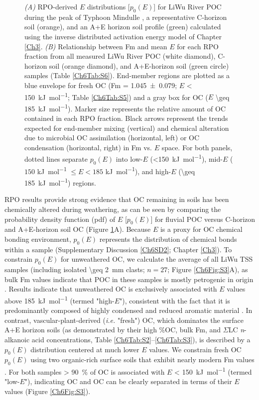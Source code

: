 \begin{figure}[p]
	\caption[RPO $p_{0}(E)$ distributions and $E$ vs. Fm plots]{\textit{(A)} RPO-derived $E$ distributions [$p_{0}(E)$] for LiWu River POC during the peak of Typhoon Mindulle \citep[white;][]{Hilton:2008fo}, a representative C-horizon soil (orange), and an A+E horizon soil profile (green) calculated using the inverse distributed activation energy model of Chapter \ref{Ch3}. \textit{(B)} Relationship between Fm and mean $E$ for each RPO fraction from all measured LiWu River POC (white diamond), C-horizon soil (orange diamond), and A+E-horizon soil (green circle) samples (Table \ref{Ch6Tab:S6}). End-member regions are plotted as a blue envelope for fresh OC (Fm = \num{1.045 \pm 0.079}; $E$ \SI{< 150}{kJ.mol^{-1}}; Table \ref{Ch6Tab:S5}) and a gray box for OC ($E$ \SI{\geq 185}{kJ.mol^{-1}}). Marker size represents the relative amount of OC contained in each RPO fraction. Black arrows represent the trends expected for end-member mixing (vertical) and chemical alteration due to microbial OC assimilation (horizontal, left) or OC condensation (horizontal, right) in Fm vs. $E$ space. For both panels, dotted lines separate $p_{0}(E)$ into low-$E$ (\SI{<150}{kJ.mol^{-1}}), mid-$E$ ($150$ \si{kJ.mol^{-1}} $\leq E < 185$ \si{kJ.mol^{-1}}), and high-$E$ (\SI{\geq 185}{kJ.mol^{-1}}) regions.}
	\label{Ch6Fig:2} 
\end{figure}

RPO results provide strong evidence that OC remaining in soils has been chemically altered during weathering, as can be seen by comparing the probability density function (pdf) of $E$ [$p_{0}(E)$] for fluvial POC versus C-horizon and A+E-horizon soil OC (Figure \ref{Ch6Fig:2}A). Because $E$ is a proxy for OC chemical bonding environment, $p_{0}(E)$ represents the distribution of chemical bonds within a sample (Supplementary Discussion \ref{Ch6SD2}; Chapter \ref{Ch3}). To constrain $p_{0}(E)$ for unweathered OC, we calculate the average of all LiWu TSS samples (including isolated \SI{\geq 2}{mm} clasts; $n = 27$; Figure \ref{Ch6Fig:S3}A), as bulk Fm values indicate that POC in these samples is mostly petrogenic in origin \citep[Table \ref{Ch6Tab:S1};][]{Hilton:2008fo,Hilton:2010cg,Hilton:2011jw}. Results indicate that unweathered OC is exclusively associated with $E$ values above \SI{185}{kJ.mol^{-1}} (termed "high-$E$"), consistent with the fact that it is predominantly composed of highly condensed and reduced aromatic material \citep{Galy:2008ff}. In contrast, vascular-plant-derived (\textit{i.e.} "fresh") OC, which dominates the surface A+E horizon soils (as demonstrated by their high \%OC, bulk Fm, and $\Sigma$LC \textit{n}-alkanoic acid concentrations, Table \ref{Ch6Tab:S2}--\ref{Ch6Tab:S3}), is described by a $p_{0}(E)$ distribution centered at much lower $E$ values. We constrain fresh OC $p_{0}(E)$ using two organic-rich surface soils that exhibit nearly modern Fm values \citep[\%OC \SI{> 5}{\%}, Fm $> 0.96$; Table \ref{Ch6Tab:S2};][]{Hilton:2013kq}. For both samples \SI{> 90}{\%} of OC is associated with $E$ \SI{< 150}{kJ.mol^{-1}} (termed "low-$E$"), indicating OC and OC can be clearly separated in terms of their $E$ values (Figure \ref{Ch6Fig:S3}). 

